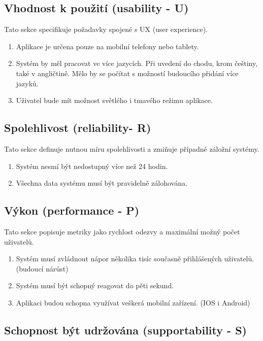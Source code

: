 \documentclass[czech,12pt,a4paper,titlepage]{article}
\begin{document}
\subsection{Vhodnost k použití (usability - U)}

Tato sekce specifikuje požadavky spojené s UX (user experience).

\begin{enumerate}
    \item Aplikace je určena pouze na mobilní telefony nebo tablety.
    \item Systém by měl pracovat ve více jazycích. Při uvedení do chodu, krom češtiny, také v angličtině. Mělo by
          se počítat s možností budoucího přidání více jazyků.
    \item Uživatel bude mít možnost světlého i tmavého režimu aplikace.
\end{enumerate}

\subsection{Spolehlivost (reliability- R)}

Tato sekce definuje nutnou míru spolehlivosti a zmiňuje případné záložní systémy.

\begin{enumerate}
    \item Systém nesmí být nedostupný více než 24 hodin.
    \item Všechna data systému musí být pravidelně zálohována.
\end{enumerate}

\subsection{Výkon (performance - P)}

Tato sekce popisuje metriky jako rychlost odezvy a maximální možný počet uživatelů.

\begin{enumerate}
    \item Systém musí zvládnout nápor několika tisíc současně přihlášených uživatelů. (budoucí nárůst)
    \item Systém musí být schopný reagovat do pěti sekund.
    \item Aplikaci budou schopna využívat veškerá mobilní zařízení. (IOS i Android)
\end{enumerate}

\subsection{Schopnost být udržována (supportability - S)}
\end{document}
